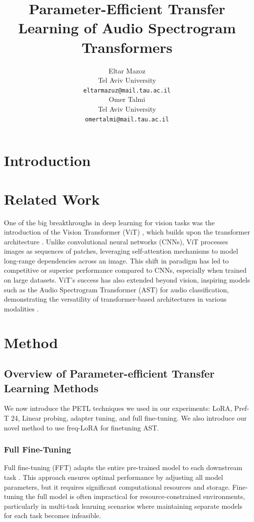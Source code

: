 \documentclass[11pt]{article}
\title{Parameter-Efficient Transfer Learning of Audio Spectrogram Transformers}
\author{Eltar Mazoz \\
  Tel Aviv University \\
  \texttt{eltarmazuz@mail.tau.ac.il} \\\And
  Omer Talmi \\
  Tel Aviv University \\
  \texttt{omertalmi@mail.tau.ac.il} \\}
\begin{document}
\maketitle
\begin{abstract}

\end{abstract}

\section{Introduction}


\section{Related Work}
One of the big breakthroughs in deep learning for vision tasks was the introduction of the Vision Transformer (ViT) \cite{dosovitskiy2020image}, which builds upon the transformer architecture \cite{vaswani2017attention}. Unlike convolutional neural networks (CNNs), ViT processes images as sequences of patches, leveraging self-attention mechanisms to model long-range dependencies across an image. This shift in paradigm has led to competitive or superior performance compared to CNNs, especially when trained on large datasets. ViT’s success has also extended beyond vision, inspiring models such as the Audio Spectrogram Transformer (AST) for audio classification, demonstrating the versatility of transformer-based architectures in various modalities \cite{gong2021ast}.


\section{Method}
\subsection{Overview of Parameter-efficient Transfer Learning Methods}

We now introduce the PETL techniques we used in our experiments: LoRA, Pref-T 24, Linear probing, adapter tuning, and full fine-tuning.
We also introduce our novel method to use freq-LoRA for finetuning AST.

\subsubsection{Full Fine-Tuning}
Full fine-tuning (FFT) adapts the entire pre-trained model to each downstream task \cite{xu2023parameter}. This approach ensures optimal performance by adjusting all model parameters, but it requires significant computational resources and storage. Fine-tuning the full model is often impractical for resource-constrained environments, particularly in multi-task learning scenarios where maintaining separate models for each task becomes infeasible.
\end{document}

